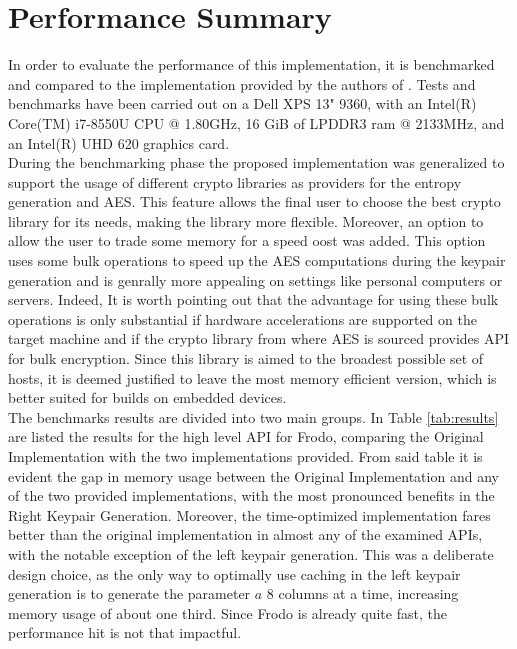 \section{Performance Summary}
In order to evaluate the performance of this implementation, it is benchmarked and compared to the implementation provided by the authors of \cite{frodo}. Tests and benchmarks have been carried out on a Dell XPS 13" 9360, with an Intel(R) Core(TM) i7-8550U CPU @ 1.80GHz, 16 GiB of LPDDR3 ram @ 2133MHz, and an Intel(R) UHD 620 graphics card.\\
During the benchmarking phase the proposed implementation was generalized to support the usage of different crypto libraries as providers for the entropy generation and AES. This feature allows the final user to choose the best crypto library for its needs, making the library more flexible. Moreover, an option to allow the user to trade some memory for a speed oost was added. This option uses some bulk operations to speed up the AES computations during the keypair generation and is genrally more appealing on settings like personal computers or servers. Indeed, It is worth pointing out that the advantage for using these bulk operations is only substantial if hardware accelerations are supported on the target machine and if the crypto library from where AES is sourced provides API for bulk encryption. Since this library is aimed to the broadest possible set of hosts, it is deemed justified to leave the most memory efficient version, which is better suited for builds on embedded devices.\\
The benchmarks results are divided into two main groups. In Table \ref{tab:results} are listed the results for the high level API for Frodo, comparing the Original Implementation with the two implementations provided. From said table it is evident the gap in memory usage between the Original Implementation and any of the two provided implementations, with the most pronounced benefits in the Right Keypair Generation. Moreover, the time-optimized implementation fares better than the original implementation in almost any of the examined APIs, with the notable exception of the left keypair generation. This was a deliberate design choice, as the only way to optimally use caching in the left keypair generation is to generate the parameter $a$ $8$ columns at a time, increasing memory usage of about one third. Since Frodo is already quite fast, the performance hit is not that impactful.\\
